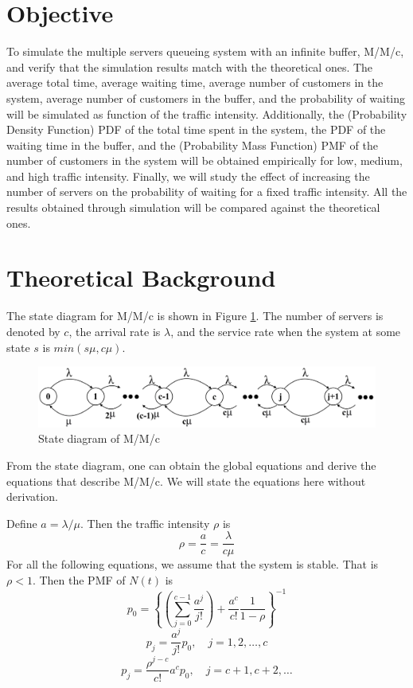 \documentclass[12pt, a4paper]{article}
\begin{document}

\onehalfspacing

\section{Objective}
To simulate the multiple servers queueing system with an infinite buffer, M/M/c, 
and verify that the simulation results match with the theoretical ones. 
The average total time, average waiting time, average number of customers in the system, 
average number of customers in the buffer, and the probability of waiting will 
be simulated as function of the traffic intensity. 
Additionally, the (Probability Density Function) PDF of the total time spent in the system, 
the PDF of the waiting time in the buffer, 
and the (Probability Mass Function) PMF of the number of customers in the system will 
be obtained empirically for low, medium, and high traffic intensity. Finally, we will 
study the effect of increasing the number of servers on the probability of waiting for a fixed
traffic intensity. All the results obtained through simulation will be compared against
the theoretical ones.

\section{Theoretical Background}
The state diagram for M/M/c is shown in Figure \ref{state_diagram_MMc}. The 
number of servers is denoted by $c$, the arrival rate is $\lambda$, and the 
service rate when the system at some state $s$ is $min(s\mu, c\mu)$.

\begin{figure}[H]
  \centering 
  \includegraphics[width=430px]{images/MMc_state_diagram.png}
  \caption{State diagram of M/M/c}
  \label{state_diagram_MMc}
\end{figure}

From the state diagram, one can obtain the global equations and derive 
the equations that describe M/M/c. We will state the equations here without
derivation.

Define $a = \lambda / \mu$. Then the traffic intensity $\rho$ is 
\begin{equation}
  \rho = \frac{a}{c} = \frac{\lambda}{c \mu}
\end{equation}
For all the following equations, we assume that the system is stable. That is 
$\rho < 1$. Then the PMF of $N(t)$ is 
\begin{equation}
  p_0 = \left\{ 
    \left( \sum_{j=0}^{c-1} \frac{a^j}{j!} \right)  
    + \frac{a^c}{c!} \frac{1}{1 - \rho}
    \right\}^{-1}
\end{equation}
\begin{equation}
  p_j = \frac{a^j}{j!} p_0, \quad j = 1, 2, \dots, c
\end{equation}
\begin{equation}
  p_j = \frac{\rho^{j-c}}{c!} a^c p_0, \quad j = c+1, c+2, \dots 
\end{equation}
\end{document}
